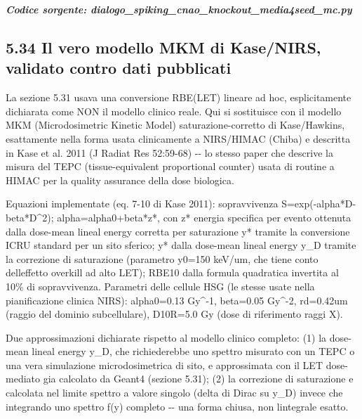 \documentclass[
  italian,
]{article}
\begin{document}
\textit{\textbf{Codice sorgente: dialogo\_\allowbreak{}spiking\_\allowbreak{}cnao\_\allowbreak{}knockout\_\allowbreak{}media4seed\_\allowbreak{}mc.py}}


\subsection{5.34 Il vero modello MKM di Kase/NIRS, validato contro dati pubblicati}\label{il-vero-modello-mkm-di-kasenirs-validato-contro-dati-pubblicati}

La sezione 5.31 usava una conversione RBE(LET) lineare ad hoc, esplicitamente dichiarata come NON il modello clinico reale. Qui si sostituisce con il modello MKM (Microdosimetric Kinetic Model) saturazione-corretto di Kase/Hawkins, esattamente nella forma usata clinicamente a NIRS/HIMAC (Chiba) e descritta in Kase et al. 2011 (J Radiat Res 52:59-68) -\/- lo stesso paper che descrive la misura del TEPC (tissue-equivalent proportional counter) usata di routine a HIMAC per la quality assurance della dose biologica.

Equazioni implementate (eq. 7-10 di Kase 2011): sopravvivenza S=exp(-alpha*D-beta*D\^{}2); alpha=alpha0+beta*z*, con z* energia specifica per evento ottenuta dalla dose-mean lineal energy corretta per saturazione y* tramite la conversione ICRU standard per un sito sferico; y* dalla dose-mean lineal energy y\_\allowbreak{}D tramite la correzione di saturazione (parametro y0=150 keV/um, che tiene conto dell\textquotesingle effetto \textquotesingle overkill\textquotesingle{} ad alto LET); RBE10 dalla formula quadratica invertita al 10\% di sopravvivenza. Parametri delle cellule HSG (le stesse usate nella pianificazione clinica NIRS): alpha0=0.13 Gy\^{}-1, beta=0.05 Gy\^{}-2, rd=0.42um (raggio del dominio subcellulare), D10R=5.0 Gy (dose di riferimento raggi X).

Due approssimazioni dichiarate rispetto al modello clinico completo: (1) la dose-mean lineal energy y\_\allowbreak{}D, che richiederebbe uno spettro misurato con un TEPC o una vera simulazione microdosimetrica di sito, e\textquotesingle{} approssimata con il LET dose-mediato gia\textquotesingle{} calcolato da Geant4 (sezione 5.31); (2) la correzione di saturazione e\textquotesingle{} calcolata nel limite \textquotesingle spettro a valore singolo\textquotesingle{} (delta di Dirac su y\_\allowbreak{}D) invece che integrando uno spettro f(y) completo -\/- una forma chiusa, non l\textquotesingle integrale esatto.
\end{document}
